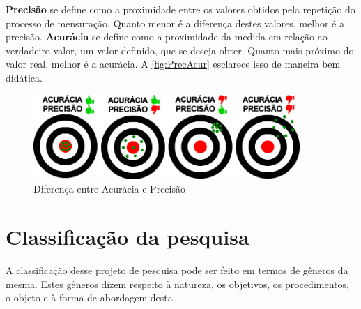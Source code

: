 \documentclass[
	12pt,				%
	openright,			%
	oneside,
	a4paper,			%
	english,			%
	french,				%
	spanish,			%
	brazil,				%
	]{abntex2}
\begin{document}
\textbf{Precisão} se define como a proximidade entre os valores obtidos pela repetição do processo de mensuração. Quanto menor é a diferença destes valores, melhor é a precisão. \textbf{Acurácia} se define como a proximidade da medida em relação ao verdadeiro valor, um valor definido, que se deseja obter. Quanto mais próximo do valor real, melhor é a acurácia. A \autoref{fig:PrecAcur} esclarece isso de maneira bem didática.

\begin{figure}
    \centering
    \includegraphics[width=0.9\textwidth]{Modelo_Projeto_Pesquisa_UFG_REJ_BCC/PrecisaoAcuracia.jpg}
    \caption{Diferença entre Acurácia e Precisão}
    \label{fig:PrecAcur}
\end{figure}


\section{Classificação da pesquisa}
\label{sec:classif}
A classificação desse projeto de pesquisa pode ser feito em termos de gêneros da mesma. Estes gêneros dizem respeito à natureza, os objetivos, os procedimentos, o objeto e à forma de abordagem desta.
\end{document}
